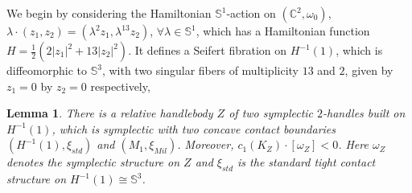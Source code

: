 \documentclass[11pt]{amsart}
\theoremstyle{plain}
\numberwithin{theorem}{section}
\newtheorem{lemma}[theorem]{Lemma}
\theoremstyle{definition}
\newcommand{\C}{{\mathbb C}}
\newcommand{\s}{{\mathbb S}}
\begin{document}
We begin by considering the Hamiltonian $\s^1$-action on $(\C^2,\omega_0)$, 
$\lambda\cdot (z_1,z_2)=(\lambda^2 z_1,\lambda^{13} z_2)$, $\forall \lambda\in\s^1$, which has a Hamiltonian function $H=\frac{1}{2}(2|z_1|^2+13|z_2|^2)$. 
It defines a Seifert fibration on $H^{-1}(1)$, which is diffeomorphic to $\s^3$, with two 
singular fibers of multiplicity $13$ and $2$, given by $z_1=0$ by $z_2=0$ respectively, 

\begin{lemma}
There is a relative handlebody $Z$ of two symplectic $2$-handles built on $H^{-1}(1)$, which is symplectic with two concave contact boundaries $(H^{-1}(1),\xi_{std})$ and $(M_1, \xi_{Mil})$.
Moreover, $c_1(K_{Z})\cdot [\omega_{Z}]<0$. Here $\omega_Z$ denotes the symplectic structure on $Z$ and
$\xi_{std}$ is the standard tight contact structure on $H^{-1}(1)\cong \s^3$. 
\end{lemma}
\end{document}
